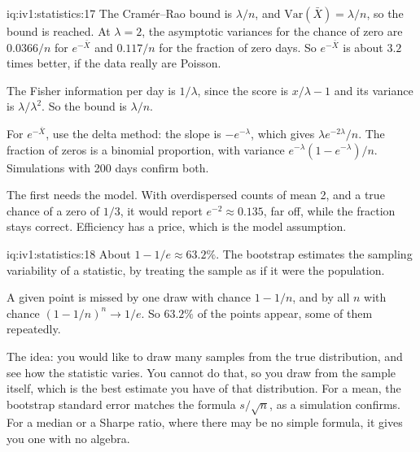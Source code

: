 \begin{solution}{iq:iv1:statistics:17}
The Cram\'er--Rao bound is $\lambda/n$, and $\mathrm{Var}(\bar{X}) = \lambda/n$, so the bound is reached. At $\lambda = 2$, the asymptotic variances for the chance of zero are $0.0366/n$ for $e^{-\bar{X}}$ and $0.117/n$ for the fraction of zero days. So $e^{-\bar{X}}$ is about $3.2$ times better, if the data really are Poisson.

The Fisher information per day is $1/\lambda$, since the score is $x/\lambda - 1$ and its variance is $\lambda/\lambda^2$. So the bound is $\lambda/n$.

For $e^{-\bar{X}}$, use the delta method: the slope is $-e^{-\lambda}$, which gives $\lambda e^{-2\lambda}/n$. The fraction of zeros is a binomial proportion, with variance $e^{-\lambda}(1 - e^{-\lambda})/n$. Simulations with 200 days confirm both.

The first needs the model. With overdispersed counts of mean 2, and a true chance of a zero of $1/3$, it would report $e^{-2} \approx 0.135$, far off, while the fraction stays correct. Efficiency has a price, which is the model assumption.

\end{solution}

\begin{solution}{iq:iv1:statistics:18}
About $1 - 1/e \approx 63.2\%$. The bootstrap estimates the sampling variability of a statistic, by treating the sample as if it were the population.

A given point is missed by one draw with chance $1 - 1/n$, and by all $n$ with chance $(1 - 1/n)^n \to 1/e$. So $63.2\%$ of the points appear, some of them repeatedly.

The idea: you would like to draw many samples from the true distribution, and see how the statistic varies. You cannot do that, so you draw from the sample itself, which is the best estimate you have of that distribution. For a mean, the bootstrap standard error matches the formula $s/\sqrt{n}$, as a simulation confirms. For a median or a Sharpe ratio, where there may be no simple formula, it gives you one with no algebra.

\end{solution}


